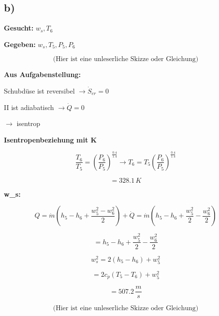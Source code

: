 

\subsection*{b)}

\textbf{Gesucht:} \(w_{s}, T_{6}\)

\textbf{Gegeben:} \(w_{s}, T_{5}, P_{5}, P_{6}\)

\[
\text{(Hier ist eine unleserliche Skizze oder Gleichung)}
\]

\textbf{Aus Aufgabenstellung:}

Schubdüse ist reversibel \(\rightarrow \dot{S}_{er} = 0\)

II ist adiabatisch \(\rightarrow \dot{Q} = 0\)

\(\rightarrow\) isentrop

\textbf{Isentropenbeziehung mit K}

\[
\frac{T_{6}}{T_{5}} = \left( \frac{P_{6}}{P_{5}} \right)^{\frac{0.4}{1.4}} \rightarrow T_{6} = T_{5} \left( \frac{P_{6}}{P_{5}} \right)^{\frac{0.4}{1.4}}
\]

\[
= 328.1 \, K
\]

\textbf{w_{s}:}

\[
Q = \dot{m} (h_{5} - h_{6} + \frac{w_{5}^{2} - w_{6}^{2}}{2}) + \dot{Q} = \dot{m} \left( h_{5} - h_{6} + \frac{w_{5}^{2}}{2} - \frac{w_{6}^{2}}{2} \right)
\]

\[
= h_{5} - h_{6} + \frac{w_{5}^{2}}{2} - \frac{w_{6}^{2}}{2}
\]

\[
w_{s}^{2} = 2 (h_{5} - h_{6}) + w_{5}^{2}
\]

\[
= 2 c_{p} (T_{5} - T_{6}) + w_{5}^{2}
\]

\[
= 507.2 \, \frac{m}{s}
\]

\[
\text{(Hier ist eine unleserliche Skizze oder Gleichung)}
\]